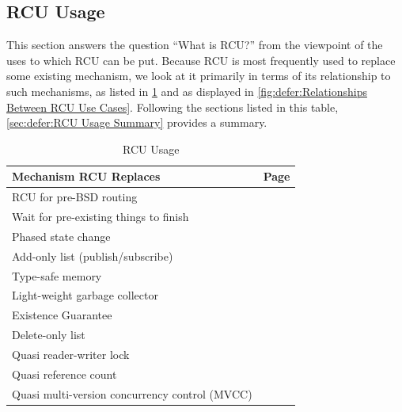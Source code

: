 
\subsection{RCU Usage}
\label{sec:defer:RCU Usage}

This section answers the question ``What is RCU?'' from the viewpoint
of the uses to which RCU can be put.
Because RCU is most frequently used to replace some existing mechanism,
we look at it primarily in terms of its relationship to such mechanisms,
as listed in \cref{tab:defer:RCU Usage}
and as displayed in \cref{fig:defer:Relationships Between RCU Use Cases}.
Following the sections listed in this table,
\cref{sec:defer:RCU Usage Summary} provides a summary.

\begin{table}
\renewcommand*{\arraystretch}{1.2}
\centering
\small
\begin{tabular}{ll}
\toprule
Mechanism RCU Replaces & Page \\
\midrule
RCU for pre-BSD routing &
	\pageref{sec:defer:RCU for Pre-BSD Routing} \\
Wait for pre-existing things to finish &
	\pageref{sec:defer:Wait for Pre-Existing Things to Finish} \\
Phased state change &
	\pageref{sec:defer:Phased State Change} \\
Add-only list (publish/subscribe) &
	\pageref{sec:defer:Add-Only List} \\
Type-safe memory &
	\pageref{sec:defer:Type-Safe Memory} \\
Light-weight garbage collector &
	\pageref{sec:defer:Light-Weight Garbage Collector} \\
Existence Guarantee &
	\pageref{sec:defer:Existence Guarantee} \\
Delete-only list &
	\pageref{sec:defer:Delete-Only List} \\
Quasi reader-writer lock &
	\pageref{sec:defer:Quasi Reader-Writer Lock} \\
Quasi reference count &
	\pageref{sec:defer:Quasi Reference Count} \\
Quasi multi-version concurrency control (MVCC) &
	\pageref{sec:defer:Quasi Multi-Version Concurrency Control} \\
\bottomrule
\end{tabular}
\caption{RCU Usage}
\label{tab:defer:RCU Usage}
\end{table}

